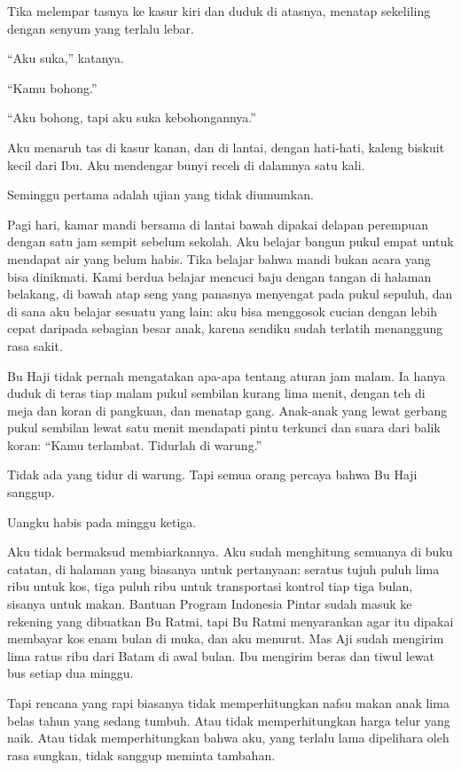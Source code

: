 \documentclass[11pt,twoside,openany]{book}
\makeatletter
\newcommand{\scenebreak}{\par\vspace{0.9em}{\centering\textsc{*\hspace{0.7em}*\hspace{0.7em}*}\par}\vspace{0.9em}\@afterindentfalse\@afterheading}
\makeatother
\begin{document}
Tika melempar tasnya ke kasur kiri dan duduk di atasnya, menatap sekeliling dengan senyum yang terlalu lebar.

``Aku suka,'' katanya.

``Kamu bohong.''

``Aku bohong, tapi aku suka kebohongannya.''

Aku menaruh tas di kasur kanan, dan di lantai, dengan hati-hati, kaleng biskuit kecil dari Ibu. Aku mendengar bunyi receh di dalamnya satu kali.

\scenebreak
Seminggu pertama adalah ujian yang tidak diumumkan.

Pagi hari, kamar mandi bersama di lantai bawah dipakai delapan perempuan dengan satu jam sempit sebelum sekolah. Aku belajar bangun pukul empat untuk mendapat air yang belum habis. Tika belajar bahwa mandi bukan acara yang bisa dinikmati. Kami berdua belajar mencuci baju dengan tangan di halaman belakang, di bawah atap seng yang panasnya menyengat pada pukul sepuluh, dan di sana aku belajar sesuatu yang lain: aku bisa menggosok cucian dengan lebih cepat daripada sebagian besar anak, karena sendiku sudah terlatih menanggung rasa sakit.

Bu Haji tidak pernah mengatakan apa-apa tentang aturan jam malam. Ia hanya duduk di teras tiap malam pukul sembilan kurang lima menit, dengan teh di meja dan koran di pangkuan, dan menatap gang. Anak-anak yang lewat gerbang pukul sembilan lewat satu menit mendapati pintu terkunci dan suara dari balik koran: ``Kamu terlambat. Tidurlah di warung.''

Tidak ada yang tidur di warung. Tapi semua orang percaya bahwa Bu Haji sanggup.

\scenebreak
Uangku habis pada minggu ketiga.

Aku tidak bermaksud membiarkannya. Aku sudah menghitung semuanya di buku catatan, di halaman yang biasanya untuk pertanyaan: seratus tujuh puluh lima ribu untuk kos, tiga puluh ribu untuk transportasi kontrol tiap tiga bulan, sisanya untuk makan. Bantuan Program Indonesia Pintar sudah masuk ke rekening yang dibuatkan Bu Ratmi, tapi Bu Ratmi menyarankan agar itu dipakai membayar kos enam bulan di muka, dan aku menurut. Mas Aji sudah mengirim lima ratus ribu dari Batam di awal bulan. Ibu mengirim beras dan tiwul lewat bus setiap dua minggu.

Tapi rencana yang rapi biasanya tidak memperhitungkan nafsu makan anak lima belas tahun yang sedang tumbuh. Atau tidak memperhitungkan harga telur yang naik. Atau tidak memperhitungkan bahwa aku, yang terlalu lama dipelihara oleh rasa sungkan, tidak sanggup meminta tambahan.
\end{document}
